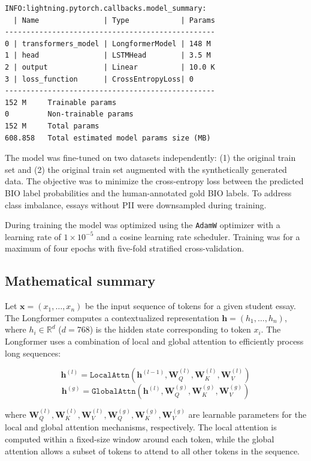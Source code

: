 \documentclass[11pt]{article}
\begin{document}
\begin{lstlisting}
INFO:lightning.pytorch.callbacks.model_summary:
  | Name               | Type            | Params
-------------------------------------------------
0 | transformers_model | LongformerModel | 148 M 
1 | head               | LSTMHead        | 3.5 M 
2 | output             | Linear          | 10.0 K
3 | loss_function      | CrossEntropyLoss| 0     
-------------------------------------------------
152 M     Trainable params
0         Non-trainable params
152 M     Total params
608.858   Total estimated model params size (MB)
\end{lstlisting}

The model was fine-tuned on two datasets independently: (1) the original train set and (2) the original train set augmented with the synthetically generated data. The objective was to minimize the cross-entropy loss between the predicted BIO label probabilities and the human-annotated gold BIO labels. To address class imbalance, essays without PII were downsampled during training.

During training the model was optimized using the \texttt{AdamW} optimizer with a learning rate of $1 \times 10^{-5}$ and a cosine learning rate scheduler. Training was for a maximum of four epochs with five-fold stratified cross-validation.

\subsection{Mathematical summary}
Let $\mathbf{x} = (x_1, \ldots, x_n)$ be the input sequence of tokens for a given student essay. The Longformer computes a contextualized representation $\mathbf{h} = (h_1, \ldots, h_n)$, where $h_i \in \mathbb{R}^d$ ($d=768$) is the hidden state corresponding to token $x_i$. The Longformer uses a combination of local and global attention to efficiently process long sequences:

\begin{equation*}
\mathbf{h}^{(l)} = \texttt{LocalAttn}(\mathbf{h}^{(l-1)}, \mathbf{W}_Q^{(l)}, \mathbf{W}_K^{(l)}, \mathbf{W}_V^{(l)})
\end{equation*}
\begin{equation*}
\mathbf{h}^{(g)} = \texttt{GlobalAttn}(\mathbf{h}^{(l)}, \mathbf{W}_Q^{(g)}, \mathbf{W}_K^{(g)}, \mathbf{W}_V^{(g)})
\end{equation*}

where $\mathbf{W}_Q^{(l)}, \mathbf{W}_K^{(l)}, \mathbf{W}_V^{(l)}, \mathbf{W}_Q^{(g)}, \mathbf{W}_K^{(g)}, \mathbf{W}_V^{(g)}$ are learnable parameters for the local and global attention mechanisms, respectively. The local attention is computed within a fixed-size window around each token, while the global attention allows a subset of tokens to attend to all other tokens in the sequence.
\end{document}
